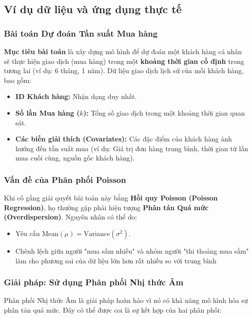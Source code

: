 \subsection{Ví dụ dữ liệu và ứng dụng thực tế}

\subsubsection*{Bài toán Dự đoán Tần suất Mua hàng}

\textbf{Mục tiêu bài toán} là xây dựng mô hình để dự đoán  
một khách hàng cá nhân sẽ thực hiện giao dịch 
(mua hàng) trong một \textbf{khoảng thời gian cố định} 
trong tương lai (ví dụ: 6 tháng, 1 năm). Dữ liệu giao dịch lịch sử của mỗi khách hàng, bao gồm:

\begin{itemize}
    \item \textbf{ID Khách hàng:} Nhận dạng duy nhất.
    \item \textbf{Số lần Mua hàng ($k$):} Tổng số giao dịch trong một khoảng thời gian quan sát.
    \item  \textbf{Các biến giải thích (Covariates):} Các đặc điểm của khách hàng ảnh hưởng đến tần suất mua (ví dụ: Giá trị đơn hàng trung bình, thời gian từ lần mua cuối cùng, nguồn gốc khách hàng).
\end{itemize}

\subsubsection*{Vấn đề của Phân phối Poisson} 
Khi cố gắng giải quyết bài toán này bằng 
\textbf{Hồi quy Poisson (Poisson Regression)}, 
họ thường gặp phải hiện tượng \textbf{Phân tán Quá mức (Overdispersion)}.
Nguyên nhân có thể do:
\begin{itemize}
    \item {}  Yêu cầu $\text{Mean} (\mu) = \text{Variance} (\sigma^2)$.
    \item Chênh lệch giữa người "mua sắm nhiều" và nhóm người "thi thoảng mua sắm" làm cho phương sai của dữ liệu lớn hơn rất  nhiều so với trung bình
\end{itemize}

\subsubsection*{Giải pháp: Sử dụng Phân phối Nhị thức Âm}

Phân phối Nhị thức Âm là giải pháp hoàn hảo 
vì nó có khả năng mô hình hóa sự phân tán quá mức.
Đây có thể được coi là sự kết hợp của hai phân phối:

